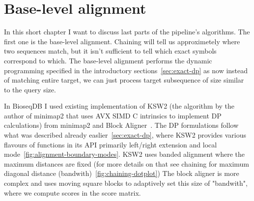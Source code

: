 \section{Base-level alignment}
\label{sec:final-alignment-role}
\label{sec:final-alignment-cpu-contracts}

In this short chapter I want to discuss last parts of the pipeline's algorithms. The first one is the base-level alignment.
Chaining will tell us approximetely where two sequences match, but it isn't sufficient to tell which exact symbols correspond to which. The base-level alignment performs the dynamic programming specified in the introductory sections~\ref{sec:exact-dp} as
now instead of matching entire target, we can just process target subsequence of size similar to the query size.


In BioseqDB I used existing implementation of KSW2 (the algorithm by the author of minimap2 that uses AVX SIMD C intrinsics to implement DP calculations)
from minimap2 and Block Aligner~\cite{minimap2_paper,block_aligner_paper}.
The DP formulations follow what was described already easlier~\ref{sec:exact-dp}, where KSW2 provides various flavours of functions in its API primarily left/right extension and local mode~\ref{fig:alignment-boundary-modes}.
KSW2 uses banded alignment where the maximum distances are fixed (for more details on that see chaining for maximum diagonal distance (bandwith)~\ref{fig:chaining-dotplot})
The block aligner is more complex and uses moving square blocks to adaptively set this size of "bandwith", where we compute scores in the score matrix.


